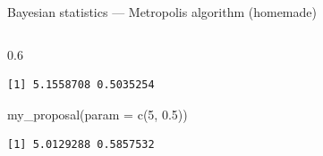 \documentclass[
  ignorenonframetext,
  aspectratio=169,
  t]{beamer}
\newenvironment{Shaded}{\begin{snugshade}}{\end{snugshade}}
\newcommand{\AttributeTok}[1]{\textcolor[rgb]{0.40,0.45,0.13}{#1}}
\newcommand{\DecValTok}[1]{\textcolor[rgb]{0.68,0.00,0.00}{#1}}
\newcommand{\FloatTok}[1]{\textcolor[rgb]{0.68,0.00,0.00}{#1}}
\newcommand{\FunctionTok}[1]{\textcolor[rgb]{0.28,0.35,0.67}{#1}}
\newcommand{\NormalTok}[1]{\textcolor[rgb]{0.00,0.23,0.31}{#1}}
\begin{document}
\begin{frame}[fragile]{Bayesian statistics --- Metropolis algorithm
(homemade)}
\begin{columns}[T]
\begin{column}{0.6\linewidth}
\begin{verbatim}
[1] 5.1558708 0.5035254
\end{verbatim}

\begin{Shaded}
\begin{Highlighting}[]
\FunctionTok{my\_proposal}\NormalTok{(}\AttributeTok{param =} \FunctionTok{c}\NormalTok{(}\DecValTok{5}\NormalTok{, }\FloatTok{0.5}\NormalTok{))}
\end{Highlighting}
\end{Shaded}

\begin{verbatim}
[1] 5.0129288 0.5857532
\end{verbatim}

\normalsize
\end{column}
\end{columns}
\end{frame}
\end{document}
